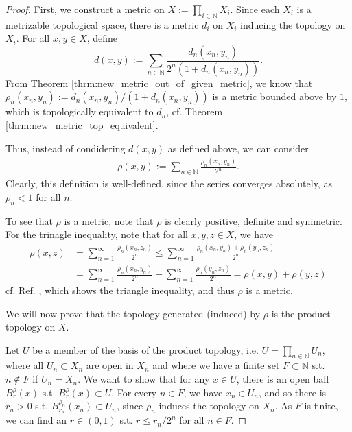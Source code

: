 \begin{proof}\cite{361778, 362319}
	First, we construct a metric on $X := \prod_{i\in\mathbb N}X_i$. Since each $X_i$ is a metrizable topological space, there is a metric $d_i$ on $X_i$ inducing the topology on $X_i$. For all $x, y\in X$, define
	$$d(x, y) := \sum_{n\in\mathbb N}\frac{d_n(x_n, y_n)}{2^n\left(1 + d_n(x_n, y_n)\right)}.$$
	From Theorem \ref{thrm:new_metric_out_of_given_metric}, we know that $\rho_n(x_n, y_n) := d_n(x_n, y_n) / (1 + d_n(x_n, y_n))$ is a metric bounded above by $1$, which is topologically equivalent to $d_n$, cf. Theorem \ref{thrm:new_metric_top_equivalent}. 
	
	Thus, instead of condidering $d(x, y)$ as defined above, we can consider 
	\begin{align}\label{eq:metric_inducing_tychonoff_top_on_countable_prod}
		\rho(x, y) := \sum_{n\in\mathbb N}\frac{\rho_n(x_n, y_n)}{2^n}.
	\end{align}
	Clearly, this definition is well-defined, since the series converges absolutely, as $\rho_n < 1$ for all $n$.
	
	To see that $\rho$ is a metric, note that $\rho$ is clearly positive, definite and symmetric. For the trinagle inequality, note that for all $x, y, z\in X$, we have
	\begin{align*}
		\rho(x, z) &= \sum_{n=1}^{\infty}\frac{\rho_n(x_n, z_n)}{2^n} \leq \sum_{n=1}^{\infty}\frac{\rho_n(x_n, y_n) + \rho_n(y_n, z_n)}{2^n} 
		\\ &= \sum_{n=1}^{\infty}\frac{\rho_n(x_n, y_n)}{2^n} + \sum_{n=1}^{\infty}\frac{\rho_n(y_n, z_n)}{2^n} = \rho(x, y) + \rho(y, z)
	\end{align*}
	cf. Ref. \cite{2163556}, which shows the triangle inequality, and thus $\rho$ is a metric.
	
	We will now prove that the topology generated (induced) by $\rho$ is the product topology on $X$. 
	
	Let $U$ be a member of the basis of the product topology, i.e. $U = \prod_{n\in\mathbb N}U_n$, where all $U_n\subset X_n$ are open in $X_n$ and where we have a finite set $F\subset\mathbb N$ s.t. $n\notin F$ if $U_n = X_n$. We want to show that for any $x\in U$, there is an open ball $B^{\rho}_{r}(x)$ s.t. $B_r^{\rho}(x)\subset U$. For every $n\in F$, we have $x_n\in U_n$, and so there is $r_n > 0$ s.t. $B^{\rho_n}_{r_n}(x_n) \subset U_n$, since $\rho_n$ induces the topology on $X_n$. As $F$ is finite, we can find an $r\in (0, 1)$ s.t. $r \leq r_n/2^n$ for all $n\in F$.
	

\end{proof}
